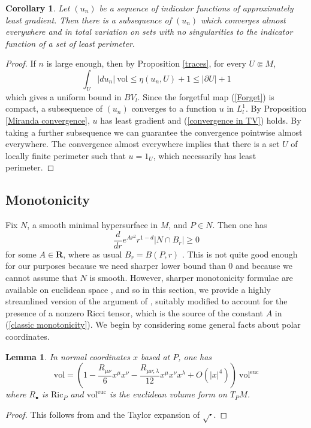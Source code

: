 \documentclass[reqno,12pt,letterpaper]{amsart}
\newcommand{\RR}{\mathbf{R}}
\newcommand{\Ric}{\mathrm{Ric}}
\newcommand{\vol}{\mathrm{vol}}
\newtheorem{lemma}[theorem]{Lemma}
\newtheorem{corollary}[theorem]{Corollary}
\theoremstyle{definition}
\numberwithin{equation}{section}
\begin{document}
\begin{corollary}\label{compactness}
Let $(u_n)$ be a sequence of indicator functions of approximately least gradient.
Then there is a subsequence of $(u_n)$ which converges almost everywhere and in total variation on sets with no singularities to the indicator function of a set of least perimeter.
\end{corollary}
\begin{proof}
If $n$ is large enough, then by Proposition \ref{traces}, for every $U \Subset M$,
$$\int_U |du_n| ~\vol \leq \eta(u_n, U) + 1 \leq |\partial U| + 1$$
which gives a uniform bound in $BV_l$.
Since the forgetful map (\ref{Forget}) is compact, a subsequence of $(u_n)$ converges to a function $u$ in $L^1_l$.
By Proposition \ref{Miranda convergence}, $u$ has least gradient and (\ref{convergence in TV}) holds.
By taking a further subsequence we can guarantee the convergence pointwise almost everywhere.
The convergence almost everywhere implies that there is a set $U$ of locally finite perimeter such that $u = 1_U$, which necessarily has least perimeter.
\end{proof}


\subsection{Monotonicity}\label{inequalities}
Fix $N$, a smooth minimal hypersurface in $M$, and $P \in N$. Then one has
\begin{equation}\label{classic monotonicity}
\frac{d}{dr} e^{Ar^2}r^{1 - d} |N \cap B_r| \geq 0
\end{equation}
for some $A \in \RR$, where as usual $B_r = B(P, r)$ \cite[\S7]{MarquesXX}.
This is not quite good enough for our purposes because we need sharper lower bound than $0$ and because we cannot assume that $N$ is smooth.
However, sharper monotonicity formulae are available on euclidean space \cite[Proposition 5.12]{Giusti77}, and so in this section, we provide a highly streamlined version of the argument of \cite[Chapter 5]{Giusti77}, suitably modified to account for the presence of a nonzero Ricci tensor, which is the source of the constant $A$ in (\ref{classic monotonicity}).
We begin by considering some general facts about polar coordinates.

\begin{lemma}\label{taylor metric det}
In normal coordinates $x$ based at $P$, one has
$$\vol = \left(1 - \frac{R_{\mu\nu}}{6} x^\mu x^\nu - \frac{R_{\mu\nu;\lambda}}{12} x^\mu x^\nu x^\lambda + O(|x|^4)\right) ~\vol^{\mathrm{euc}}$$
where $R_\bullet$ is $\Ric_P$ and $\vol^{\mathrm{euc}}$ is the euclidean volume form on $T_PM$.
\end{lemma}
\begin{proof}
This follows from \cite[Lemma 3.4]{schoen1994lectures} and the Taylor expansion of $\sqrt \cdot$.
\end{proof}
\end{document}
